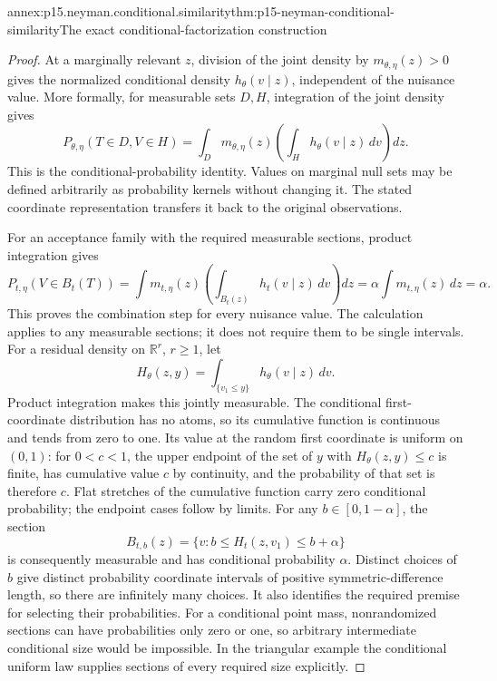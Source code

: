\begin{annexitem}{annex:p15.neyman.conditional.similarity}{thm:p15-neyman-conditional-similarity}{The exact conditional-factorization construction}
\begin{proof}
At a marginally relevant \(z\), division of the joint
density by \(m_{\theta,\eta}(z)>0\) gives the normalized
conditional density \(h_\theta(v\mid z)\), independent
of the nuisance value. More formally, for measurable
sets \(D,H\), integration of the joint density gives
\[
 P_{\theta,\eta}(T\in D,V\in H)
   =\int_Dm_{\theta,\eta}(z)
                       \left(\int_Hh_\theta(v\mid z)\,dv\right)dz.
\]
This is the conditional-probability identity. Values on
marginal null sets may be defined arbitrarily as probability
kernels without changing it. The stated coordinate
representation transfers it back to the original observations.

For an acceptance family with the required measurable
sections, product integration gives
\[
 P_{t,\eta}(V\in B_t(T))
  =\int m_{t,\eta}(z)
                 \left(\int_{B_t(z)}h_t(v\mid z)\,dv\right)dz
  =\alpha\int m_{t,\eta}(z)\,dz=\alpha.
\]
This proves the combination step for every nuisance value.
The calculation applies to any measurable sections;
it does not require them to be single intervals.
For a residual density on \(\mathbb R^r\), \(r\geq1\), let
\[
 H_\theta(z,y)=\int_{\{v_1\leq y\}}h_\theta(v\mid z)\,dv.
\]
Product integration makes this jointly measurable.
The conditional first-coordinate distribution has no atoms,
so its cumulative function is continuous and tends from zero
to one. Its value at the random first coordinate is uniform
on \((0,1)\): for \(0<c<1\), the upper endpoint of the
set of \(y\) with \(H_\theta(z,y)\leq c\) is finite,
has cumulative value \(c\) by continuity, and the probability
of that set is therefore \(c\). Flat stretches of the
cumulative function carry zero conditional probability;
the endpoint cases follow by limits.
For any \(b\in[0,1-\alpha]\), the section
\[
       B_{t,b}(z)=\{v:b\leq H_t(z,v_1)\leq b+\alpha\}
\]
is consequently measurable and has conditional probability
\(\alpha\). Distinct choices of \(b\) give distinct probability
coordinate intervals of positive symmetric-difference length,
so there are infinitely many choices.
It also identifies the required premise for selecting
their probabilities. For a conditional point mass,
nonrandomized sections can have probabilities only
zero or one, so arbitrary intermediate conditional
size would be impossible. In the triangular example
the conditional uniform law supplies sections of
every required size explicitly.
\end{proof}
\end{annexitem}

